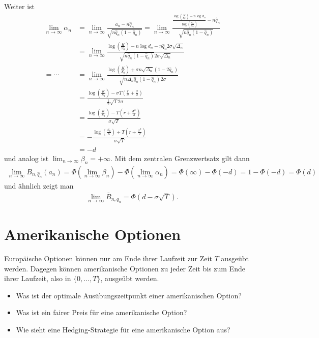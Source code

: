 \documentclass[a4paper,twoside,DIV15,BCOR12mm]{scrbook}
\begin{document}
\begin{beweis}
Weiter ist
\begin{align*}
\lim_{n\to\infty} \alpha_n &= \lim_{n\to\infty} \frac{a_n - n\hat q_n}{\sqrt{n\hat q_n(1-\hat q_n)}} = \lim_{n\to\infty}\frac{\frac{\log(\frac K {S_0}) - n \log d_n }{\log(\frac{u_n}{d_n})} - n \hat q_n}{\sqrt{n \hat q_n (1-\hat q_n)}} \\
&= \lim_{n\to\infty} \frac{ \log(\frac K {S_0}) - n \log d_n - n\hat q_n 2\sigma \sqrt{\Delta_n}}{\sqrt{n \hat q_n ( 1- \hat q_n)}2\sigma\sqrt{\Delta_n}} \\
= \cdots &= \lim_{n\to\infty} \frac{\log (\frac K{S_0}) + \sigma n \sqrt{\Delta_n}(1-2\hat q_n)}{\sqrt{n \Delta_n \hat q_n (1-\hat q_n)}2\sigma} \\
&= \frac{\log (\frac K {S_0}) - \sigma T (\frac r\sigma + \frac \sigma 2)}{\frac 12 \sqrt T 2\sigma} \\
&= \frac{\log (\frac K {S_0}) - T (r+ \frac{\sigma^2}{2})}{\sigma\sqrt T} \\
&= - \frac{\log(\frac {S_0}K) + T (r + \frac{\sigma^2}{2})}{\sigma\sqrt T} \\
&= - d
\end{align*}
und analog ist
$\lim_{n\to\infty}\beta_{n}= +\infty$. Mit dem zentralen Grenzwertsatz gilt dann
\begin{align*}
\lim_{n\to\infty} B_{n,\hat q_n}(a_n) = \Phi(\lim_{n\to\infty} \beta_n) - \Phi(\lim_{n\to\infty} \alpha_n) = \Phi(\infty) - \Phi(-d) = 1 - \Phi(-d) = \Phi(d)
\end{align*}
und ähnlich zeigt man 
\begin{align*}
\lim_{n\to\infty} \bar B_{n,q_n} = \Phi(d-\sigma\sqrt T).
\end{align*}
\end{beweis}

\section{Amerikanische Optionen}

Europäische Optionen können nur am Ende ihrer Laufzeit zur Zeit $T$ ausgeübt werden. Dagegen können amerikanische Optionen zu jeder Zeit bis zum Ende ihrer Laufzeit, also in $\{0,\ldots,T\}$, ausgeübt werden.
\begin{itemize}
\item Was ist der optimale Ausübungszeitpunkt einer amerikanischen Option?
\item Was ist ein fairer Preis für eine amerikanische Option?
\item Wie sieht eine Hedging-Strategie für eine amerikanische Option aus?
\end{itemize}
\end{document}
